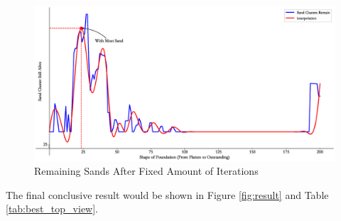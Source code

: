 \documentclass[12pt]{article}
\begin{document}
\begin{figure}[H]
    \centering
    \includegraphics[width=0.95\linewidth]{sands.eps}
    \caption{Remaining Sands After Fixed Amount of Iterations}
    \label{fig:result_sand_reserve}
\end{figure}
The final conclusive result would be shown in Figure \ref{fig:result} and Table \ref{tab:best_top_view}.
\end{document}
